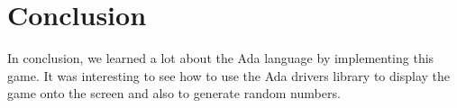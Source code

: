 \section{Conclusion}

In conclusion, we learned a lot about the Ada language by implementing this game.
It was interesting to see how to use the Ada drivers library to display the game onto the \stmdb screen and also to generate random numbers.

\newpage


